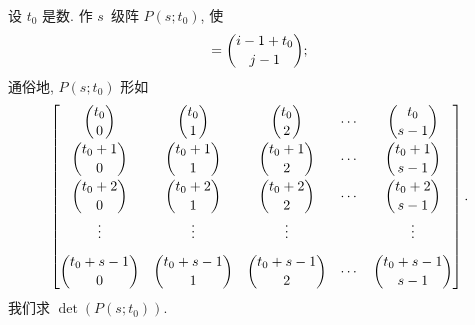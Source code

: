 \documentclass[../libro.tex]{subfiles}
\begin{document}
\begin{example}
    设 \(t_0\) 是数.
    作 \(s\)~级阵 \(P(s; t_0)\), 使
    \begin{align*}
        [P(s; t_0)] = \dbinom{i-1+t_0}{j-1};
    \end{align*}
    通俗地, \(P(s; t_0)\) 形如
    \begin{align*}
        \begin{bmatrix}
            \dbinom{t_0}{0}     & \dbinom{t_0}{1}     & \dbinom{t_0}{2}     & \cdots & \dbinom{t_0}{s-1}     \\[2ex]
            \dbinom{t_0+1}{0}   & \dbinom{t_0+1}{1}   & \dbinom{t_0+1}{2}   & \cdots & \dbinom{t_0+1}{s-1}   \\[2ex]
            \dbinom{t_0+2}{0}   & \dbinom{t_0+2}{1}   & \dbinom{t_0+2}{2}   & \cdots & \dbinom{t_0+2}{s-1}   \\[2ex]
            \vdots              & \vdots              & \vdots              & {}     & \vdots                \\[2ex]
            \dbinom{t_0+s-1}{0} & \dbinom{t_0+s-1}{1} & \dbinom{t_0+s-1}{2} & \cdots & \dbinom{t_0+s-1}{s-1} \\
        \end{bmatrix}.
    \end{align*}
    我们求 \(\det {(P(s; t_0))}\).


\end{example}
\end{document}
